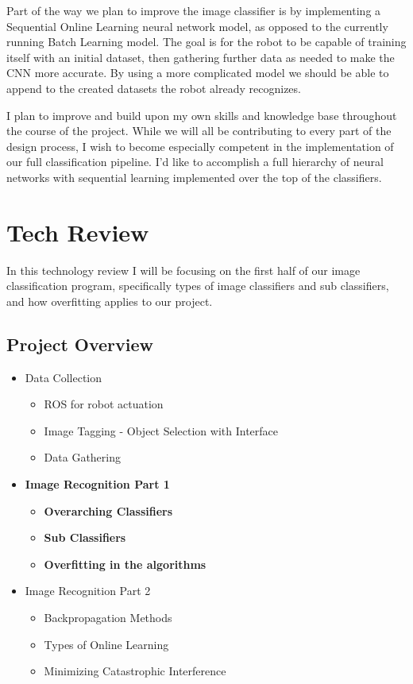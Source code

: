 \documentclass[draftclsnofoot, onecolumn, 10pt, compsoc]{IEEEtran}
\begin{document}
Part of the way we plan to improve the image classifier is by implementing a Sequential Online Learning neural network model, as opposed to the currently running Batch Learning model. The goal is for the robot to be capable of training itself with an initial dataset, then gathering further data as needed to make the CNN more accurate. By using a more complicated model we should be able to append to the created datasets the robot already recognizes. 

I plan to improve and build upon my own skills and knowledge base throughout the course of the project. While we will all be contributing to every part of the design process, I wish to become especially competent in the implementation of our full classification pipeline. I'd like to accomplish a full hierarchy of neural networks with sequential learning implemented over the top of the classifiers. 

\section{Tech Review}
In this technology review I will be focusing on the first half of our image classification program, specifically types of image classifiers and sub classifiers, and how overfitting applies to our project. 
	\subsection{Project Overview}
    	\begin{itemize}
			\item Data Collection
            	\begin{itemize}
            		\item ROS for robot actuation
                  	\item Image Tagging - Object Selection with Interface
                  	\item Data Gathering
              	\end{itemize}
      		\item \textbf{Image Recognition Part 1}
        		\begin{itemize}
          			\item \textbf{Overarching Classifiers}
          			\item \textbf{Sub Classifiers}
          			\item \textbf{Overfitting in the algorithms}
        		\end{itemize}
      		\item Image Recognition Part 2
        		\begin{itemize}
          			\item Backpropagation Methods
          			\item Types of Online Learning
          			\item Minimizing Catastrophic Interference
        	\end{itemize}
    	\end{itemize}
        
\end{document}

